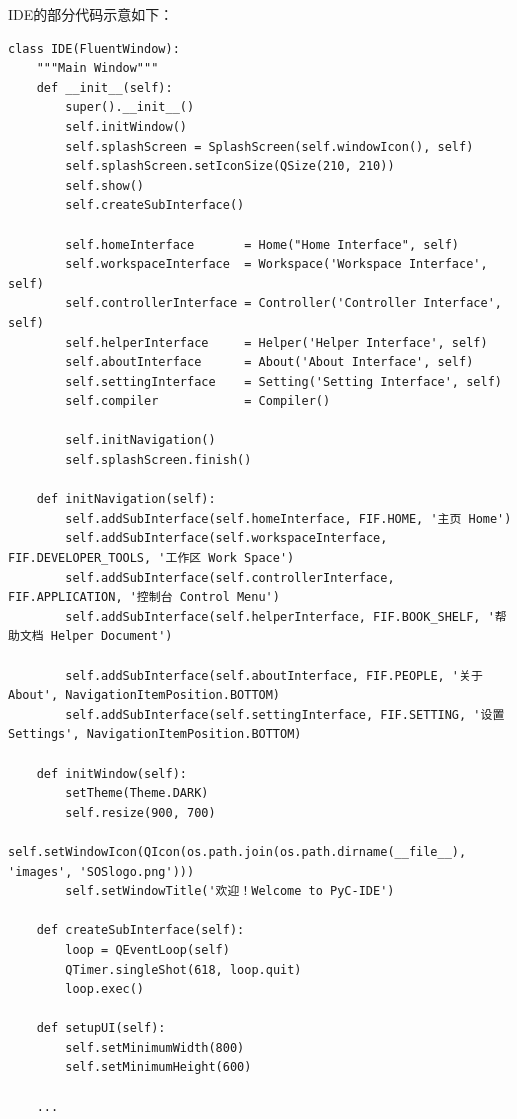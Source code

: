 \documentclass[12pt]{article}
\begin{document}
IDE的部分代码示意如下：
\begin{lstlisting}
class IDE(FluentWindow):
    """Main Window"""
    def __init__(self):
        super().__init__()
        self.initWindow()
        self.splashScreen = SplashScreen(self.windowIcon(), self)
        self.splashScreen.setIconSize(QSize(210, 210))
        self.show()
        self.createSubInterface()
        
        self.homeInterface       = Home("Home Interface", self)
        self.workspaceInterface  = Workspace('Workspace Interface', self)
        self.controllerInterface = Controller('Controller Interface', self)
        self.helperInterface     = Helper('Helper Interface', self)
        self.aboutInterface      = About('About Interface', self)
        self.settingInterface    = Setting('Setting Interface', self)
        self.compiler            = Compiler()

        self.initNavigation()
        self.splashScreen.finish()

    def initNavigation(self):
        self.addSubInterface(self.homeInterface, FIF.HOME, '主页 Home')
        self.addSubInterface(self.workspaceInterface, FIF.DEVELOPER_TOOLS, '工作区 Work Space')
        self.addSubInterface(self.controllerInterface, FIF.APPLICATION, '控制台 Control Menu')
        self.addSubInterface(self.helperInterface, FIF.BOOK_SHELF, '帮助文档 Helper Document')

        self.addSubInterface(self.aboutInterface, FIF.PEOPLE, '关于 About', NavigationItemPosition.BOTTOM)
        self.addSubInterface(self.settingInterface, FIF.SETTING, '设置 Settings', NavigationItemPosition.BOTTOM)

    def initWindow(self):
        setTheme(Theme.DARK)
        self.resize(900, 700)
        self.setWindowIcon(QIcon(os.path.join(os.path.dirname(__file__), 'images', 'SOSlogo.png')))
        self.setWindowTitle('欢迎！Welcome to PyC-IDE')

    def createSubInterface(self):
        loop = QEventLoop(self)
        QTimer.singleShot(618, loop.quit)
        loop.exec()

    def setupUI(self):
        self.setMinimumWidth(800)
        self.setMinimumHeight(600)
    
    ...
\end{lstlisting}
\end{document}
